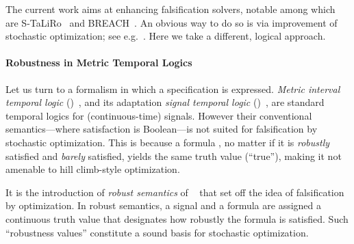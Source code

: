 \documentclass[envcountsect,orivec]{llncs} \usepackage{etex} \usepackage[]{graphicx}
\begin{document}
The current work aims at enhancing falsification solvers, notable among which are
S-TaLiRo~\cite{DBLP:conf/tacas/AnnpureddyLFS11}
and
BREACH~\cite{DBLP:conf/cav/Donze10}. 
An obvious way to do so is via improvement of stochastic optimization;
see e.g.~\cite{Sankaranarayanan:2012:FTP:2185632.2185653,Zutshi:2014:MSC:2656045.2656061}. Here we take a different, logical approach.

\paragraph{Robustness in Metric Temporal Logics}
Let us turn to a formalism in which a specification
 is expressed. 
\emph{Metric interval temporal logic} 
()~\cite{DBLP:dblp_journals/jacm/AlurFH96}, 
and its adaptation
\emph{signal temporal logic} 
()~\cite{DBLP:conf/formats/MalerN04}, 
are standard temporal logics for (continuous-time) signals. 
However their conventional
semantics---where satisfaction is Boolean---is not suited for
falsification by stochastic optimization. 
This is because a formula , no matter if it is 
\emph{robustly} satisfied and \emph{barely} satisfied, yields the same
truth value (``true''), making it  not amenable to hill climb-style
optimization.

It is  the introduction of \emph{robust semantics} of
~\cite{DBLP:journals/tcs/FainekosP09} that set off the idea of falsification by
optimization. In robust semantics,  a signal  and a
formula  are assigned a continuous truth value 
that designates how robustly the formula is satisfied. Such ``robustness
values'' constitute a sound basis for stochastic optimization.
\end{document}
